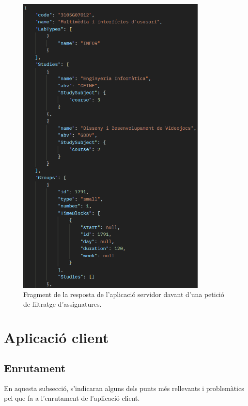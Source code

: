 \documentclass[a4paper,12pt]{ThesisStyle}
\begin{document}
\begin{figure}[H]
  \centering
  \includegraphics[width=0.85\textwidth]{assets/proves/respostaSubjects.png}
  \caption{\label{img:respostaSubjects} Fragment de la resposta de l'aplicació servidor davant d'una petició de filtratge d'assignatures.}
\end{figure}

\newpage

\section{Aplicació client}
\label{sec:imp_client}

\subsection{Enrutament}
\label{subsec:enrutament_client}

En aquesta subsecció, s'indicaran alguns dels punts més rellevants i problemàtics pel que fa a l'enrutament de l'aplicació client.
\end{document}

